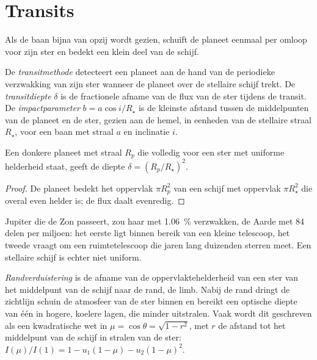 \section{Transits}\label{sec:b3:exoplanets:transits}

Als de baan bijna van opzij wordt gezien, schuift de planeet
eenmaal per omloop voor zijn ster en bedekt een klein deel van de schijf.

\begin{definition}\label{def:b3:exoplanets:transit}
De \emph{transitmethode} detecteert een planeet aan de hand van de
periodieke verzwakking van zijn ster wanneer de planeet over de stellaire schijf trekt. De
\emph{transitdiepte} $\delta$ is de fractionele afname
van de flux van de ster tijdens de transit. De
\emph{impactparameter} $b = a\cos i/R_\star$ is de kleinste afstand
tussen de middelpunten van de planeet en de ster, gezien
aan de hemel, in eenheden van de stellaire straal $R_\star$, voor een baan
met straal $a$ en inclinatie $i$.
\end{definition}

\begin{proposition}[Transitdiepte]\label{prop:b3:exoplanets:depth}
Een donkere planeet met straal $R_p$ die volledig voor een ster met uniforme
helderheid staat, geeft de diepte $\delta = (R_p/R_\star)^2$.
\end{proposition}

\begin{proof}
De planeet bedekt het oppervlak $\pi R_p^2$ van een schijf met oppervlak $\pi R_\star^2$
die overal even helder is; de flux daalt evenredig.
\end{proof}

Jupiter die de Zon passeert, zou haar met \qty{1.06}{\percent} verzwakken, de Aarde
met \num{84} delen per miljoen: het eerste ligt binnen bereik van een kleine
telescoop, het tweede vraagt om een ruimtetelescoop die jaren lang duizenden
sterren meet. Een stellaire schijf is echter niet uniform.

\begin{definition}[Randverduistering]\label{def:b3:exoplanets:limb}
\emph{Randverduistering} is de afname van de oppervlaktehelderheid
van een ster van het middelpunt van de schijf naar de rand, de limb.
Nabij de rand dringt de zichtlijn schuin de atmosfeer van de ster binnen
en bereikt een optische diepte van één in hogere, koelere lagen, die
minder uitstralen. Vaak wordt dit geschreven als een kwadratische wet in $\mu = \cos\theta =
\sqrt{1 - r^2}$, met $r$ de afstand tot het middelpunt van de schijf in
stralen van de ster: $I(\mu)/I(1) = 1 - u_1(1 - \mu) - u_2(1 - \mu)^2$.
\end{definition}

